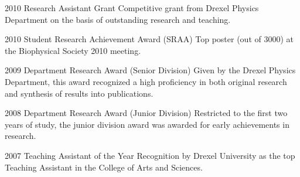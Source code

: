 \documentclass[]{scrartcl}
\begin{document}
\begin{cleanCV}
\WorkExperienceX
{2010}
{Research Assistant Grant}
{Competitive grant from Drexel Physics Department on the basis of outstanding research and teaching.}

\WorkExperienceX
{2010}
{Student Research Achievement Award (SRAA)}
{Top poster (out of $3000$) at the Biophysical Society 2010 meeting. }

\WorkExperienceX
{2009}
{Department Research Award (Senior Division)}
{Given by the Drexel Physics Department, this award recognized a high proficiency in both original research and synthesis of results into publications. }

\WorkExperienceX
{2008}
{Department Research Award (Junior Division)}
{Restricted to the first two years of study, the junior division award was awarded for early achievements in research.}

\WorkExperienceX
{2007}
{Teaching Assistant of the Year}
{Recognition by Drexel University as the top Teaching Assistant in the College of Arts and Sciences.}

\newpage


\end{cleanCV}
\end{document}
